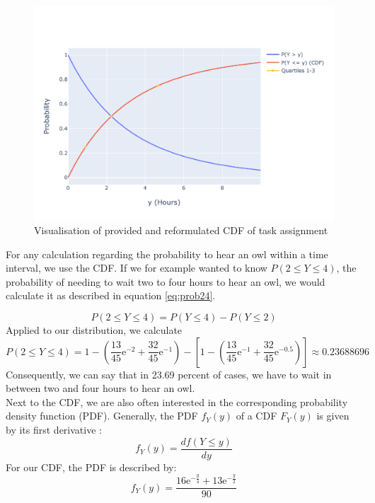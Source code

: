 \begin{figure}[h]
\centering
\includegraphics[width=16cm]{pics/1c1.pdf}
\caption{Visualisation of provided and reformulated CDF of task assignment}
\label{fig:1c1}
\end{figure}
\FloatBarrier


For any calculation regarding the probability to hear an owl within a time interval, we use the CDF. If we for example wanted to know $P(2 \leq Y \leq 4)$, the probability of needing to wait two to four hours to hear an owl, we would calculate it as described in equation \eqref{eq:prob24}.

\begin{equation} P(2 \leq Y \leq 4) = P(Y \leq 4) - P(Y \leq 2)
\label{eq:prob24}
\end{equation}
Applied to our distribution, we calculate
\begin{equation} P (2 \leq Y \leq 4) =1-\left( \dfrac{13}{45}\mathrm{e}^{-2} + \dfrac{32}{45}\mathrm{e}^{-1}\right) -\left[ 1-\left( \dfrac{13}{45}\mathrm{e}^{-1} + \dfrac{32}{45}\mathrm{e}^{-0.5}\right)\right] 	\approx 0.23688696
\label{eq:probcalc24}
\end{equation}
Consequently, we can say that in 23.69 percent of cases, we have to wait in between two and four hours to hear an owl.
\\

Next to the CDF, we are also often interested in the corresponding probability density function (PDF). Generally, the PDF $f_Y(y)$ of a CDF $F_Y(y)$ is given by its first derivative \cite[Chapter~4.3]{montgomery2010applied}:
\begin{equation}
f_Y(y) = \frac{df(Y \leq y)}{dy}
\label{eq:firstderivative}
\end{equation}
For our CDF, the PDF is described by:
\begin{equation}
f_Y(y) = \dfrac{16\mathrm{e}^{-\frac{y}{4}}+13\mathrm{e}^{-\frac{y}{2}}}{90}
\label{eq:pdf}
\end{equation}


